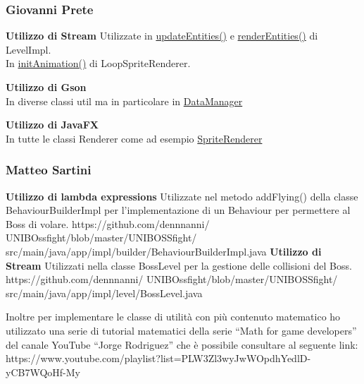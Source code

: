 \documentclass{article}
\begin{document}
\subsubsection{Giovanni Prete}
\textbf{Utilizzo di Stream}
\newline
Utilizzate in \href{https://github.com/dennnanni/UNIBOssfight/blob/0768464f3f7be0d1f35435f89616902091c0b7a8/UNIBOSSfight/src/main/java/app/impl/level/LevelImpl.java#L72}{updateEntities()} e \href{https://github.com/dennnanni/UNIBOssfight/blob/0768464f3f7be0d1f35435f89616902091c0b7a8/UNIBOSSfight/src/main/java/app/impl/level/LevelImpl.java#L125}{renderEntities()} di LevelImpl.\\
In \href{https://github.com/dennnanni/UNIBOssfight/blob/0b788e3202136a52ea940d4dedaac28589c7eb66/UNIBOSSfight/src/main/java/app/impl/component/LoopSpriteRenderer.java#L76}{initAnimation()} di LoopSpriteRenderer.

\textbf{Utilizzo di Gson}\\
In diverse classi util ma in particolare in \href{https://github.com/dennnanni/UNIBOssfight/blob/0b788e3202136a52ea940d4dedaac28589c7eb66/UNIBOSSfight/src/main/java/app/util/DataManager.java}{DataManager}

\textbf{Utilizzo di JavaFX}\\
In tutte le classi Renderer come ad esempio \href{https://github.com/dennnanni/UNIBOssfight/blob/0b788e3202136a52ea940d4dedaac28589c7eb66/UNIBOSSfight/src/main/java/app/impl/component/SpriteRenderer.java#L55}{SpriteRenderer}

\subsubsection{Matteo Sartini}
\textbf{Utilizzo di lambda expressions}
\newline
Utilizzate nel metodo addFlying() della classe BehaviourBuilderImpl per l'implementazione di un Behaviour per permettere al Boss di volare.
https://github.com/dennnanni/
UNIBOssfight/blob/master/UNIBOSSfight/
src/main/java/app/impl/builder/BehaviourBuilderImpl.java
\textbf{Utilizzo di Stream}
\newline
Utilizzati nella classe BossLevel per la gestione delle collisioni del Boss.
https://github.com/dennnanni/
UNIBOssfight/blob/master/UNIBOSSfight/
src/main/java/app/impl/level/BossLevel.java

Inoltre per implementare le classe di utilità con più contenuto matematico ho utilizzato una serie di tutorial matematici della serie “Math for game developers” del canale YouTube “Jorge Rodriguez” che è possibile consultare al seguente link:
https://www.youtube.com/playlist?list=PLW3Zl3wyJwWOpdhYedlD-yCB7WQoHf-My
\large
\end{document}
